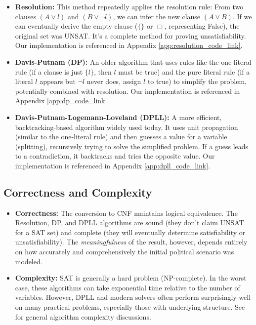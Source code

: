 \documentclass[11pt, a4paper]{article}
\begin{document}
\begin{itemize}
    \item \textbf{Resolution:} This method \cite{Robinson1965} repeatedly applies the resolution rule: From two clauses $(A \vee l)$ and $(B \vee \neg l)$, we can infer the new clause $(A \vee B)$. If we can eventually derive the empty clause ($\{\}$ or $\Box$, representing False), the original set was UNSAT. It's a complete method for proving unsatisfiability. Our implementation is referenced in Appendix \ref{app:resolution_code_link}.
    \item \textbf{Davis-Putnam (DP):} An older algorithm \cite{DavisPutnam1960} that uses rules like the one-literal rule (if a clause is just $\{l\}$, then $l$ must be true) and the pure literal rule (if a literal $l$ appears but $\neg l$ never does, assign $l$ to true) to simplify the problem, potentially combined with resolution. Our implementation is referenced in Appendix \ref{app:dp_code_link}.
    \item \textbf{Davis-Putnam-Logemann-Loveland (DPLL):} A more efficient, backtracking-based algorithm \cite{DPLL1962} widely used today. It uses unit propagation (similar to the one-literal rule) and then guesses a value for a variable (splitting), recursively trying to solve the simplified problem. If a guess leads to a contradiction, it backtracks and tries the opposite value. Our implementation is referenced in Appendix \ref{app:dpll_code_link}.
\end{itemize}

\subsection*{Correctness and Complexity}

\begin{itemize}
    \item \textbf{Correctness:} The conversion to CNF maintains logical equivalence. The Resolution, DP, and DPLL algorithms are sound (they don't claim UNSAT for a SAT set) and complete (they will eventually determine satisfiability or unsatisfiability). The \textit{meaningfulness} of the result, however, depends entirely on how accurately and comprehensively the initial political scenario was modeled.
    \item \textbf{Complexity:} SAT is generally a hard problem (NP-complete). In the worst case, these algorithms can take exponential time relative to the number of variables. However, DPLL and modern solvers often perform surprisingly well on many practical problems, especially those with underlying structure. See \cite{Cormen1996} for general algorithm complexity discussions.
\end{itemize}
\end{document}
